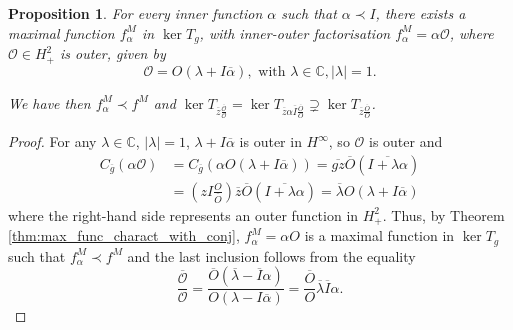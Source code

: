 \documentclass[10pt,a4paper]{amsart}
\newtheorem{prop}{Proposition}
\newcommand{\CC}{\ensuremath{\mathbb{C}}}
\newcommand{\Cg}{\ensuremath{C_{\ol g}}}
\newcommand{\Hinf}{\ensuremath{H^\infty}}
\newcommand{\Hp}{\ensuremath{H^2_+}}
\newcommand{\OO}{\ensuremath{\mathcal{O}}}
\newcommand{\ol}[1]{\ensuremath{\overline{#1}}}
\begin{document}
\begin{prop}
\label{prop:maximal_function_prescribed_inner_factor}
For every inner function $\alpha$ such that $\alpha \prec I$, there exists a maximal function $f_\alpha^M$ in $\ker T_g$, with inner-outer factorisation $f_\alpha^M = \alpha\OO$, where $\OO\in\Hp$ is outer, given by
\begin{equation}
\label{eq:outer_factor_max_func_prescribed_inner_factor}
\OO = O (\lambda + I \ol \alpha ), \text{ with } \lambda \in\CC, |\lambda| = 1.
\end{equation}

We have then $f_\alpha^M \prec f^M$ and $\ker T_{\ol z \frac{\ol\OO}{\OO}} = \ker T_{\ol z \alpha \ol I \frac{\ol O}{O}} \supsetneq \ker T_{\ol z \frac{\ol O}{O}}$.
\end{prop}

\begin{proof}
For any $\lambda \in \CC$, $|\lambda|=1$, $\lambda + I \ol\alpha$ is outer in \Hinf, so $\OO$ is outer and
\begin{align*}
\Cg ( \alpha\OO) &= \Cg \left(\alpha O \left(\lambda + I \ol\alpha\right) \right) = \ol {gz} \ol O \left(\ol{ I + \lambda \alpha}\right) \\
&= \left(z I \frac{O}{\ol O}\right) \ol z \ol O \left(\ol{ I + \lambda \alpha}\right) = \ol\lambda O \left(\lambda + I \ol\alpha\right)
\end{align*}
where the right-hand side represents an outer function in \Hp.
Thus, by Theorem \ref{thm:max_func_charact_with_conj}, $f_\alpha^M = \alpha O$ is a maximal function in $\ker T_g$ such that $f_\alpha^M \prec f^M$ and the last inclusion follows from the equality
\[
\frac{\ol\OO}{\OO} = \frac{\ol O (\ol\lambda - \ol I \alpha)}{O (\lambda - I \ol\alpha)} = \frac{\ol O}{O} \ol\lambda \ol I \alpha.
\]
\end{proof}
\end{document}
